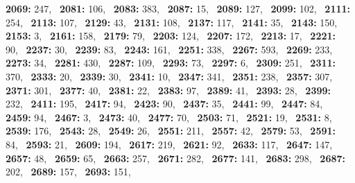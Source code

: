 \textbf{2069:} 247,\allowbreak~ 
\textbf{2081:} 106,\allowbreak~ 
\textbf{2083:} 383,\allowbreak~ 
\textbf{2087:} 15,\allowbreak~ 
\textbf{2089:} 127,\allowbreak~ 
\textbf{2099:} 102,\allowbreak~ 
\textbf{2111:} 254,\allowbreak~ 
\textbf{2113:} 107,\allowbreak~ 
\textbf{2129:} 43,\allowbreak~ 
\textbf{2131:} 108,\allowbreak~ 
\textbf{2137:} 117,\allowbreak~ 
\textbf{2141:} 35,\allowbreak~ 
\textbf{2143:} 150,\allowbreak~ 
\textbf{2153:} 3,\allowbreak~ 
\textbf{2161:} 158,\allowbreak~ 
\textbf{2179:} 79,\allowbreak~ 
\textbf{2203:} 124,\allowbreak~ 
\textbf{2207:} 172,\allowbreak~ 
\textbf{2213:} 17,\allowbreak~ 
\textbf{2221:} 90,\allowbreak~ 
\textbf{2237:} 30,\allowbreak~ 
\textbf{2239:} 83,\allowbreak~ 
\textbf{2243:} 161,\allowbreak~ 
\textbf{2251:} 338,\allowbreak~ 
\textbf{2267:} 593,\allowbreak~ 
\textbf{2269:} 233,\allowbreak~ 
\textbf{2273:} 34,\allowbreak~ 
\textbf{2281:} 430,\allowbreak~ 
\textbf{2287:} 109,\allowbreak~ 
\textbf{2293:} 73,\allowbreak~ 
\textbf{2297:} 6,\allowbreak~ 
\textbf{2309:} 251,\allowbreak~ 
\textbf{2311:} 370,\allowbreak~ 
\textbf{2333:} 20,\allowbreak~ 
\textbf{2339:} 30,\allowbreak~ 
\textbf{2341:} 10,\allowbreak~ 
\textbf{2347:} 341,\allowbreak~ 
\textbf{2351:} 238,\allowbreak~ 
\textbf{2357:} 307,\allowbreak~ 
\textbf{2371:} 301,\allowbreak~ 
\textbf{2377:} 40,\allowbreak~ 
\textbf{2381:} 22,\allowbreak~ 
\textbf{2383:} 97,\allowbreak~ 
\textbf{2389:} 41,\allowbreak~ 
\textbf{2393:} 28,\allowbreak~ 
\textbf{2399:} 232,\allowbreak~ 
\textbf{2411:} 195,\allowbreak~ 
\textbf{2417:} 94,\allowbreak~ 
\textbf{2423:} 90,\allowbreak~ 
\textbf{2437:} 35,\allowbreak~ 
\textbf{2441:} 99,\allowbreak~ 
\textbf{2447:} 84,\allowbreak~ 
\textbf{2459:} 94,\allowbreak~ 
\textbf{2467:} 3,\allowbreak~ 
\textbf{2473:} 40,\allowbreak~ 
\textbf{2477:} 70,\allowbreak~ 
\textbf{2503:} 71,\allowbreak~ 
\textbf{2521:} 19,\allowbreak~ 
\textbf{2531:} 8,\allowbreak~ 
\textbf{2539:} 176,\allowbreak~ 
\textbf{2543:} 28,\allowbreak~ 
\textbf{2549:} 26,\allowbreak~ 
\textbf{2551:} 211,\allowbreak~ 
\textbf{2557:} 42,\allowbreak~ 
\textbf{2579:} 53,\allowbreak~ 
\textbf{2591:} 84,\allowbreak~ 
\textbf{2593:} 21,\allowbreak~ 
\textbf{2609:} 194,\allowbreak~ 
\textbf{2617:} 219,\allowbreak~ 
\textbf{2621:} 92,\allowbreak~ 
\textbf{2633:} 117,\allowbreak~ 
\textbf{2647:} 147,\allowbreak~ 
\textbf{2657:} 48,\allowbreak~ 
\textbf{2659:} 65,\allowbreak~ 
\textbf{2663:} 257,\allowbreak~ 
\textbf{2671:} 282,\allowbreak~ 
\textbf{2677:} 141,\allowbreak~ 
\textbf{2683:} 298,\allowbreak~ 
\textbf{2687:} 202,\allowbreak~ 
\textbf{2689:} 157,\allowbreak~ 
\textbf{2693:} 151,\allowbreak~ 
